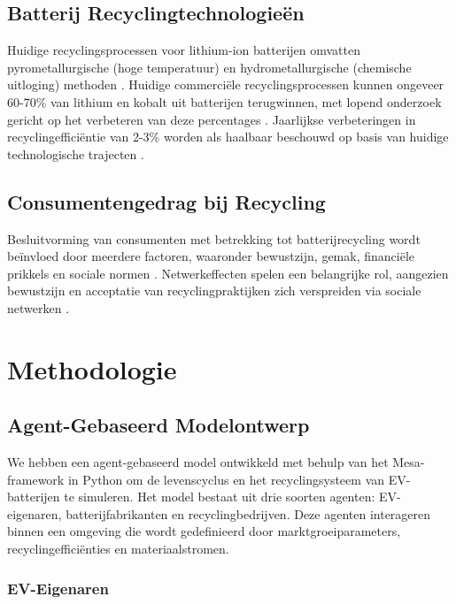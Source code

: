 \documentclass[10pt,a4paper,twocolumn]{article}
\begin{document}
\subsection{Batterij Recyclingtechnologieën}

Huidige recyclingsprocessen voor lithium-ion batterijen omvatten pyrometallurgische (hoge temperatuur) en hydrometallurgische (chemische uitloging) methoden \citep{zheng2018}. Huidige commerciële recyclingsprocessen kunnen ongeveer 60-70\% van lithium en kobalt uit batterijen terugwinnen, met lopend onderzoek gericht op het verbeteren van deze percentages \citep{dunn2021}. Jaarlijkse verbeteringen in recyclingefficiëntie van 2-3\% worden als haalbaar beschouwd op basis van huidige technologische trajecten \citep{rmi2022}.

\subsection{Consumentengedrag bij Recycling}

Besluitvorming van consumenten met betrekking tot batterijrecycling wordt beïnvloed door meerdere factoren, waaronder bewustzijn, gemak, financiële prikkels en sociale normen \citep{sun2020}. Netwerkeffecten spelen een belangrijke rol, aangezien bewustzijn en acceptatie van recyclingpraktijken zich verspreiden via sociale netwerken \citep{axsen2013}.

\section{Methodologie}
\label{sec:methodology}

\subsection{Agent-Gebaseerd Modelontwerp}

We hebben een agent-gebaseerd model ontwikkeld met behulp van het Mesa-framework in Python om de levenscyclus en het recyclingsysteem van EV-batterijen te simuleren. Het model bestaat uit drie soorten agenten: EV-eigenaren, batterijfabrikanten en recyclingbedrijven. Deze agenten interageren binnen een omgeving die wordt gedefinieerd door marktgroeiparameters, recyclingefficiënties en materiaalstromen.

\subsubsection{EV-Eigenaren}
\end{document}
